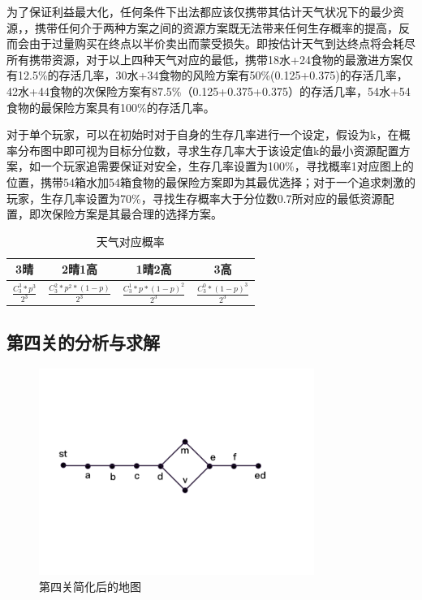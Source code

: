 \documentclass[a4paper]{ctexart}
\begin{document}
为了保证利益最大化，任何条件下出法都应该仅携带其估计天气状况下的最少资源，，携带任何介于两种方案之间的资源方案既无法带来任何生存概率的提高，反而会由于过量购买在终点以半价卖出而蒙受损失。即按估计天气到达终点将会耗尽所有携带资源，对于以上四种天气对应的最低，携带18水+24食物的最激进方案仅有12.5\%的存活几率，30水+34食物的风险方案有50\%(0.125+0.375)的存活几率，42水+44食物的次保险方案有87.5\%（0.125+0.375+0.375）的存活几率，54水+54食物的最保险方案具有100\%的存活几率。

对于单个玩家，可以在初始时对于自身的生存几率进行一个设定，假设为k，在概率分布图中即可视为目标分位数，寻求生存几率大于该设定值k的最小资源配置方案，如一个玩家追需要保证对安全，生存几率设置为100\%，寻找概率1对应图上的位置，携带54箱水加54箱食物的最保险方案即为其最优选择；对于一个追求刺激的玩家，生存几率设置为70\%，寻找生存概率大于分位数0.7所对应的最低资源配置，即次保险方案是其最合理的选择方案。

\begin{table}

\centering

\begin{tabular}{c || c || c || c }
    
      3晴 & 2晴1高 & 1晴2高 & 3高   \\
    \hline
    \hline
      $\frac{C^{3}_{3}*p^{3}}{2^{3}}$ & $\frac{C^{2}_{3}*p^{2}*(1-p)}{2^{3}}$ & $\frac{C^{1}_{3}*p*(1-p)^{2}}{2^{3}}$ & $\frac{C^{0}_{3}*(1-p)^{3}}{2^{3}}$ \\

\end{tabular}

\caption{天气对应概率}

\end{table}

\subsection{第四关的分析与求解}

\begin{figure}[htpb]
    \centering
    \includegraphics[width=0.8\textwidth]{./pictures/stage4.png}
    \caption{第四关简化后的地图}
    \label{fig:stage4}
\end{figure}
\end{document}
